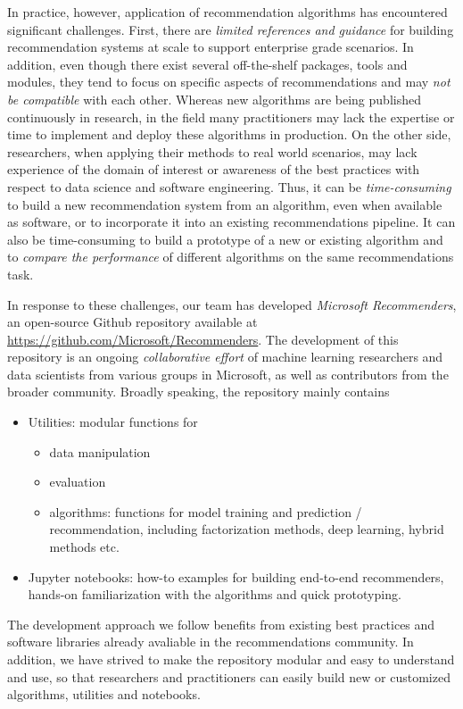 In practice, however, application of recommendation algorithms has encountered significant challenges. 
First, there are {\em limited references and guidance} for building recommendation systems at scale to support
enterprise grade scenarios. In addition, even though there exist several off-the-shelf packages, tools and modules, they tend to focus on specific aspects of recommendations 
and may {\em not be compatible} with each other. Whereas new algorithms are being published continuously in research, in the field many practitioners may lack the 
expertise or time to implement and deploy these algorithms in production. 
On the other side, researchers, when applying their methods to real world scenarios, may lack experience of the domain of interest
or awareness of the best practices with respect to data science and software engineering. Thus, it can be {\em time-consuming} to build a new recommendation system from an
algorithm, even when available as software, or to incorporate it into an existing recommendations pipeline. It can also be time-consuming to build a prototype of a new or existing algorithm and to 
{\em compare the performance} of different algorithms on the same recommendations task. 

In response to these challenges, our team has developed {\em Microsoft Recommenders}, an open-source 
Github repository available at \url{https://github.com/Microsoft/Recommenders}.
The development of this repository is an ongoing {\em collaborative effort} of machine learning researchers and data scientists from 
various groups in Microsoft, as well as contributors from the broader community.
Broadly speaking, the repository mainly contains 
\begin{itemize}
\item
Utilities: modular functions for 
\begin{itemize}
\item data manipulation
\item evaluation 
\item algorithms: functions for model training and prediction / recommendation, including factorization methods, deep learning, hybrid methods etc.
\end{itemize}
\item
Jupyter notebooks: how-to examples for building end-to-end recommenders, hands-on familiarization with the algorithms and quick prototyping. 
\end{itemize}
The development approach we follow benefits from existing best practices and software libraries already avaliable in the recommendations community.
In addition, we have strived to make the repository modular and easy to understand and use, so that researchers and practitioners can easily build
new or customized algorithms, utilities and notebooks.

